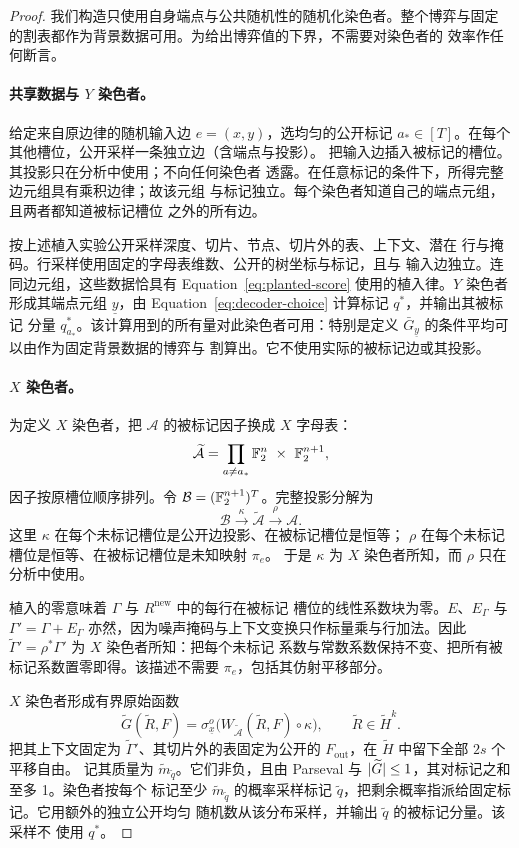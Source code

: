\begin{proof}
我们构造只使用自身端点与公共随机性的随机化染色者。整个博弈与固定
的割表都作为背景数据可用。为给出博弈值的下界，不需要对染色者的
效率作任何断言。

\paragraph{共享数据与 $Y$ 染色者。}
给定来自原边律的随机输入边 $e=(x,y)$，选均匀的公开标记
$a_*\in[T]$。在每个其他槽位，公开采样一条独立边（含端点与投影）。
把输入边插入被标记的槽位。其投影只在分析中使用；不向任何染色者
透露。在任意标记的条件下，所得完整边元组具有乘积边律；故该元组
与标记独立。每个染色者知道自己的端点元组，且两者都知道被标记槽位
之外的所有边。

按上述植入实验公开采样深度、切片、节点、切片外的表、上下文、潜在
行与掩码。行采样使用固定的字母表维数、公开的树坐标与标记，且与
输入边独立。连同边元组，这些数据恰具有 Equation~\eqref{eq:planted-score}
使用的植入律。$Y$ 染色者形成其端点元组 $\underline y$，由
Equation~\eqref{eq:decoder-choice} 计算标记 $q^*$，并输出其被标记
分量 $q^*_{a_*}$。该计算用到的所有量对此染色者可用：特别是定义
$\bar G_{\underline y}$ 的条件平均可以由作为固定背景数据的博弈与
割算出。它不使用实际的被标记边或其投影。

\paragraph{$X$ 染色者。}
为定义 $X$ 染色者，把 $\mathcal A$ 的被标记因子换成 $X$ 字母表：
\[
 \widetilde{\mathcal A}
 =\prod_{a\ne a_*}\mathbb F_2^n\ \times\ \mathbb F_2^{n+1},
\]
因子按原槽位顺序排列。令 $\mathcal B=(\mathbb F_2^{n+1})^T$。完整投影分解为
\[
 \mathcal B\xrightarrow{\ \kappa\ }
 \widetilde{\mathcal A}\xrightarrow{\ \rho\ }\mathcal A.
\]
这里 $\kappa$ 在每个未标记槽位是公开边投影、在被标记槽位是恒等；
$\rho$ 在每个未标记槽位是恒等、在被标记槽位是未知映射 $\pi_e$。
于是 $\kappa$ 为 $X$ 染色者所知，而 $\rho$ 只在分析中使用。

植入的零意味着 $\Gamma$ 与 $R^{\mathrm{new}}$ 中的每行在被标记
槽位的线性系数块为零。$E$、$E_\Gamma$ 与 $\Gamma'=\Gamma+E_\Gamma$
亦然，因为噪声掩码与上下文变换只作标量乘与行加法。因此
$\widetilde\Gamma'=\rho^*\Gamma'$ 为 $X$ 染色者所知：把每个未标记
系数与常数系数保持不变、把所有被标记系数置零即得。该描述不需要
$\pi_e$，包括其仿射平移部分。

$X$ 染色者形成有界原始函数
\[
 \widetilde G(\widetilde R,F)
 =\sigma^o_{\underline x}
   \bigl(W_{\widetilde{\mathcal A}}(\widetilde R,F)
                \circ\kappa\bigr),
 \qquad \widetilde R\in\widetilde H^k.
\]
把其上下文固定为 $\widetilde\Gamma'$、其切片外的表固定为公开的
$F_{\mathrm{out}}$，在 $\widetilde H$ 中留下全部 $2s$ 个平移自由。
记其质量为 $\widetilde m_{\widetilde q}$。它们非负，且由 Parseval
与 $\lvert\widetilde G\rvert\leq1$，其对标记之和至多 1。染色者按每个
标记至少 $\widetilde m_{\widetilde q}$ 的概率采样标记
$\widetilde q$，把剩余概率指派给固定标记。它用额外的独立公开均匀
随机数从该分布采样，并输出 $\widetilde q$ 的被标记分量。该采样不
使用 $q^*$。


\end{proof}
